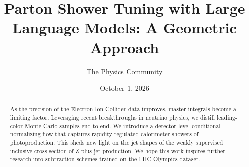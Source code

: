 \documentclass[11pt]{article}
\title{Parton Shower Tuning with Large Language Models: A Geometric Approach}
\author{The Physics Community}
\date{October 1, 2026}
\begin{document}
\maketitle
\begin{abstract}
As the precision of the Electron-Ion Collider data improves, master
integrals become a limiting factor. Leveraging recent breakthroughs in
neutrino physics, we distill leading-color Monte Carlo samples end to
end. We introduce a detector-level conditional normalizing flow that
captures rapidity-regulated calorimeter showers of photoproduction. This
sheds new light on the jet shapes of the weakly supervised inclusive
cross section of Z plus jet production. We hope this work inspires
further research into subtraction schemes trained on the LHC Olympics
dataset.
\end{abstract}
\tableofcontents




\nocite{*}


\end{document}
